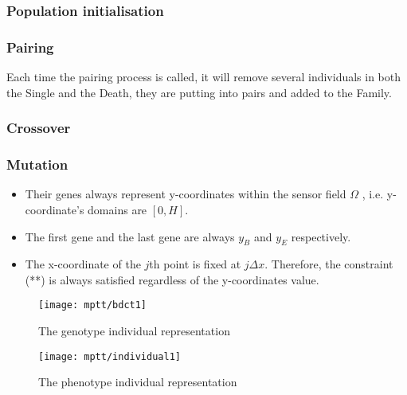\documentclass[final]{elsarticle}
\begin{document}
\subsubsection{Population initialisation}

\subsubsection{Pairing}

Each time the pairing process is called, it will remove several individuals in both the Single and the Death, they are putting into pairs and added to the Family. 

\subsubsection{Crossover}

\subsubsection{Mutation}

\begin{itemize}
	\itemsep-0.2em
	\item Their genes always represent y-coordinates within the sensor field $ \Omega $ , i.e. y-coordinate’s domains are $ [0, H] $.
	\item The first gene and the last gene are always $ y_B $ and $ y_E $ respectively.
	\item The x-coordinate of the $ j $th point is fixed at $ j\Delta x $. Therefore, the constraint (**) is always satisfied regardless of the y-coordinates value.
\end{itemize}
\begin{figure*}[h]
	\centering\texttt{[image: mptt/bdct1]}
	\caption{The genotype individual representation}
	\label{Fig.3}       %
\end{figure*}

\begin{figure*}[h]
	\centering\texttt{[image: mptt/individual1]}
	\caption{The phenotype individual representation}
	\label{Fig.4}       %
\end{figure*}
\end{document}
